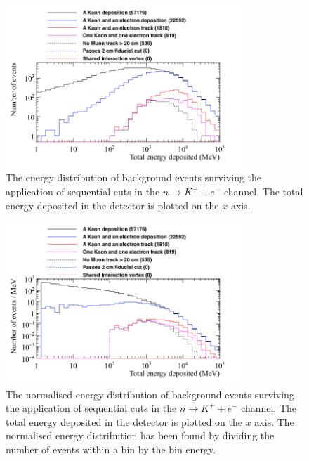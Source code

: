 \begin{figure}
  \centering
  \includegraphics[width=0.8\textwidth]{CosmicBackground_EnergyDepCuts_Raw_2cmCut}
  \caption[The energy distribution of background events surviving the application of sequential cuts in the $n \rightarrow K^{+} + e^{-}$ channel]
          {The energy distribution of background events surviving the application of sequential cuts in the $n \rightarrow K^{+} + e^{-}$ channel. The total energy deposited in the detector is plotted on the $x$ axis.}
  \label{fig:NDK_CosmoBack_Raw}
\end{figure}

\begin{figure}
  \centering
  \includegraphics[width=0.8\textwidth]{CosmicBackground_EnergyDepCuts_Norm_2cmCut}
  \caption[The normalised energy distribution of background events surviving the application of sequential cuts in the $n \rightarrow K^{+} + e^{-}$ channel]
          {The normalised energy distribution of background events surviving the application of sequential cuts in the $n \rightarrow K^{+} + e^{-}$ channel. The total energy deposited in the detector is plotted on the $x$ axis. The normalised energy distribution has been found by dividing the number of events within a bin by the bin energy.}
  \label{fig:NDK_CosmoBack_Norm}
\end{figure}

